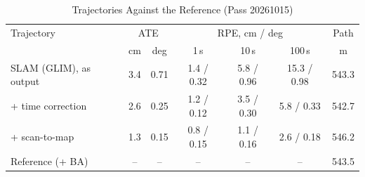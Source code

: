 \begin{table}[!t]
\centering
\caption{Trajectories Against the Reference (Pass 20261015)}
\label{tab:glim_vs_ref}
\footnotesize
\setlength{\tabcolsep}{3pt}
\begin{tabular}{lcccccc}
\toprule
Trajectory & \multicolumn{2}{c}{ATE} & \multicolumn{3}{c}{RPE, cm / deg} & Path \\
 & cm & deg & 1\,s & 10\,s & 100\,s & m \\
\midrule
SLAM (GLIM), as output & 3.4 & 0.71 & 1.4 / 0.32 & 5.8 / 0.96 & 15.3 / 0.98 & 543.3 \\
+ time correction      & 2.6 & 0.25 & 1.2 / 0.12 & 3.5 / 0.30 & 5.8 / 0.33  & 542.7 \\
\quad + scan-to-map    & 1.3 & 0.15 & 0.8 / 0.15 & 1.1 / 0.16 & 2.6 / 0.18  & 546.2 \\
Reference (+ BA)       & --  & --   & --         & --         & --          & 543.5 \\
\bottomrule
\end{tabular}
\end{table}
